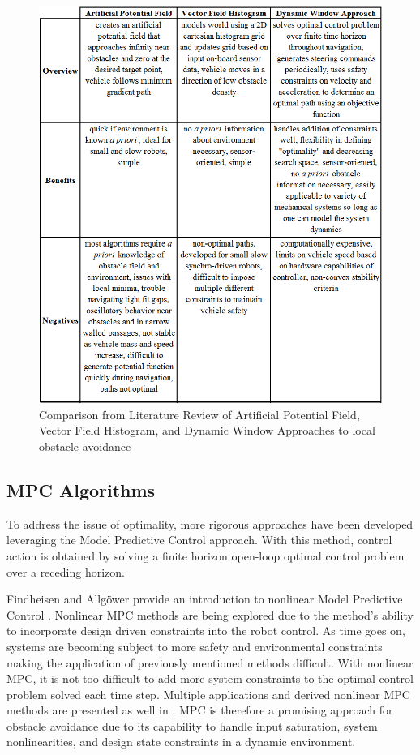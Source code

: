 \documentclass[12pt,onecolumn]{report}
\begin{document}
\newpage
\begin{figure}[H]
	\centering
	\includegraphics[width=1.0\columnwidth]{Figs/ControlMethodTable.png}
	\caption{\small Comparison from Literature Review of Artificial Potential Field, Vector Field Histogram, and Dynamic Window Approaches to local obstacle avoidance}  
	\label{fig:ControlCompare}
\end{figure}
\newpage

\subsection{MPC Algorithms}\label{ss:MPCAlgorithms}

To address the issue of optimality, more rigorous approaches have been developed leveraging the Model Predictive Control approach. With this method, control action is obtained by solving a finite horizon open-loop optimal control problem over a receding horizon.

Findheisen and Allg{\"o}wer provide an introduction to nonlinear Model Predictive Control \cite{Allgower&Findeisen2002}. Nonlinear MPC methods are being explored due to the method's ability to incorporate design driven constraints into the robot control. As time goes on, systems are becoming subject to more safety and environmental constraints making the application of previously mentioned methods difficult. With nonlinear MPC, it is not too difficult to add more system constraints to the optimal control problem solved each time step. Multiple applications and derived nonlinear MPC methods are presented as well in \cite{Allgower&Findeisen2002}. MPC is therefore a promising approach for obstacle avoidance due to its capability to handle input saturation, system nonlinearities, and design state constraints in a dynamic environment.
\end{document}
